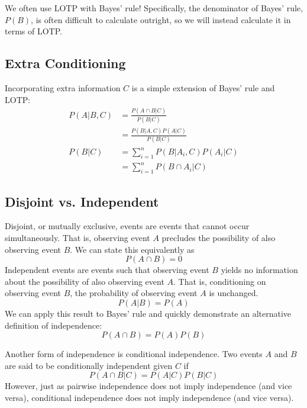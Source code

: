 \documentclass[11pt]{article}
\begin{document}
\begin{notes}
We often use LOTP with Bayes' rule! Specifically, the denominator of Bayes' rule, $P(B)$, is often difficult to calculate outright, so we will instead calculate it in terms of LOTP. 

\subsection*{Extra Conditioning}
Incorporating extra information $C$ is a simple extension of Bayes' rule and LOTP:
\begin{align}
    P(A|B, C) &= \frac{P(A \cap B | C)}{P(B|C)} \\
    &= \frac{P(B|A,C)P(A|C)}{P(B|C)}\\
    P(B|C) &= \sum_{i=1}^n P(B | A_i, C) P (A_i |C)\\
    &= \sum_{i=1}^n P(B \cap A_i |C)
\end{align}

\subsection*{Disjoint vs. Independent}
Disjoint, or mutually exclusive, events are events that cannot occur simultaneously. That is, observing event $A$ precludes the possibility of also observing event $B$. We can state this equivalently as 
    \[P(A \cap B) = 0\]
Independent events are events such that observing event $B$ yields no information about the possibility of also observing event $A$. That is, conditioning on observing event $B$, the probability of observing  event $A$ is unchanged.
    \[P(A|B) = P(A)\]
We can apply this result to Bayes' rule and quickly demonstrate an alternative definition of independence:
    \[P(A \cap B) = P(A)P(B)\]

Another form of independence is conditional independence. Two events $A$ and $B$ are said to be conditionally independent given $C$ if 
    \[P(A \cap B | C) = P(A|C) P(B|C)\]
However, just as pairwise independence does not imply independence (and vice versa), conditional independence does not imply independence (and vice versa).
\end{notes}
\newpage
       
\end{document}
